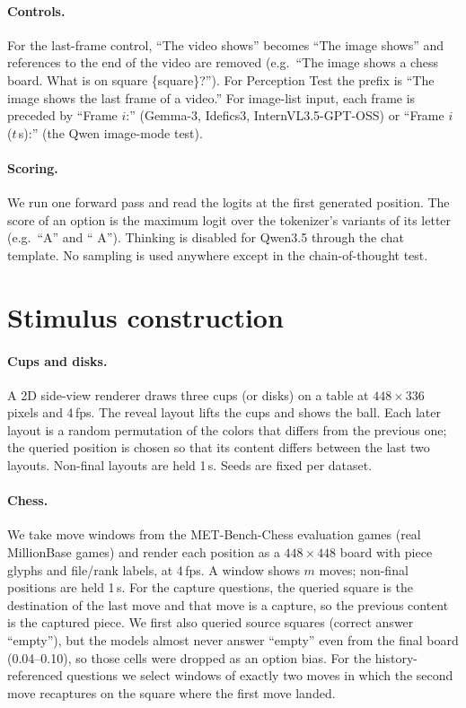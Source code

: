 \paragraph{Controls.} For the last-frame control, ``The video shows'' becomes ``The image shows'' and references to the end of the video are removed (e.g.\ ``The image shows a chess board. What is on square \{square\}?''). For Perception Test the prefix is ``The image shows the last frame of a video.'' For image-list input, each frame is preceded by ``Frame $i$:'' (Gemma-3, Idefics3, InternVL3.5-GPT-OSS) or ``Frame $i$ ($t$\,s):'' (the Qwen image-mode test).

\paragraph{Scoring.} We run one forward pass and read the logits at the first generated position. The score of an option is the maximum logit over the tokenizer's variants of its letter (e.g.\ ``A'' and `` A''). Thinking is disabled for Qwen3.5 through the chat template. No sampling is used anywhere except in the chain-of-thought test.

\section{Stimulus construction}
\label{app:stimuli}

\paragraph{Cups and disks.} A 2D side-view renderer draws three cups (or disks) on a table at $448\times336$ pixels and 4\,fps. The reveal layout lifts the cups and shows the ball. Each later layout is a random permutation of the colors that differs from the previous one; the queried position is chosen so that its content differs between the last two layouts. Non-final layouts are held 1\,s. Seeds are fixed per dataset.

\paragraph{Chess.} We take move windows from the MET-Bench-Chess evaluation games (real MillionBase games) and render each position as a $448\times448$ board with piece glyphs and file/rank labels, at 4\,fps. A window shows $m$ moves; non-final positions are held 1\,s. For the capture questions, the queried square is the destination of the last move and that move is a capture, so the previous content is the captured piece. We first also queried source squares (correct answer ``empty''), but the models almost never answer ``empty'' even from the final board (0.04--0.10), so those cells were dropped as an option bias. For the history-referenced questions we select windows of exactly two moves in which the second move recaptures on the square where the first move landed.

